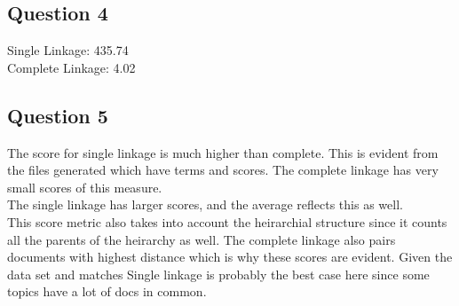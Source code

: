 \documentclass[12pt, oneside]{article}
\begin{document}
\subsection*{Question 4}
Single Linkage: 435.74\\
Complete Linkage: 4.02\\
\subsection*{Question 5}
The score for single linkage is much higher than complete. 
This is evident from the files generated which have terms and scores. 
The complete linkage has very small scores of this measure.\\
The single linkage has larger scores, and the average reflects this as well.\\
This score metric also takes into account the heirarchial structure since it counts all the parents of the heirarchy as well.
The complete linkage also pairs documents with highest distance which is why these scores are evident.
Given the data set and matches Single linkage is probably the best case here since some topics have a lot of docs in common.
\end{document}
